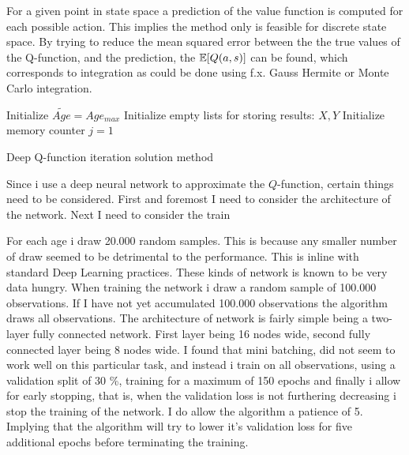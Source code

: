 For a given point in state space a prediction of the value function is computed for each possible action. This implies the method only is feasible for discrete state space. By trying to reduce the mean squared error between the the true values of the Q-function, and the prediction, the $\mathbb{E}[Q(a, s)]$ can be found, which corresponds to integration as could be done using f.x. Gauss Hermite or Monte Carlo integration.

\begin{algorithm}[H]
\SetAlgoLined
{}
 Initialize $\tilde{Age} = Age_{max}$\;
 Initialize empty lists for storing results: $X, Y$\;
 Initialize memory counter $j=1$\;
 \caption{Deep Q-function iteration solution method}
 \end{algorithm}

Since i use a deep neural network to approximate the $Q$-function, certain things need to be considered. First and foremost I need to consider the architecture of the network. Next I need to consider the train

For each age i draw 20.000 random samples. This is because any smaller number of draw seemed to be detrimental to the performance. This is inline with standard Deep Learning practices. These kinds of network is known to be very data hungry. When training the network i draw a random sample of 100.000 observations. If I have not yet accumulated 100.000 observations the algorithm draws all observations. The architecture of network is fairly simple being a two-layer fully connected network. First layer being 16 nodes wide, second fully connected layer being 8 nodes wide. I found that mini batching, did not seem to work well on this particular task, and instead i train on all observations, using a validation split of 30 \%, training for a maximum of 150 epochs and finally i allow for early stopping, that is, when the validation loss is not furthering decreasing i stop the training of the network. I do allow the algorithm a patience of 5. Implying that the algorithm will try to lower it's validation loss for five additional epochs before terminating the training.


